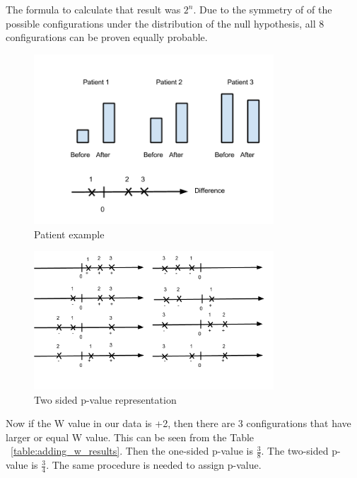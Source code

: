 \documentclass[12pt]{article}
\begin{document}
The formula to calculate that result was $2^n$. Due to the symmetry of of the possible configurations under the distribution of the null hypothesis, all 8 configurations can be proven equally probable.
\begin{figure}[h!]
  \centering
  \includegraphics[width=0.8\textwidth]{patientExample}
  \caption{Patient example}
  \label{fig:patientExample}
\end{figure}

\begin{figure}[h!]
  \centering
  \includegraphics[width=0.8\textwidth]{rankSignsExample}
  \caption{Two sided p-value representation}
  \label{fig:rankSignsExample}
\end{figure}

Now if the W value in our data is +2, then there are 3 configurations that have larger or equal W value. This can be seen from the Table ~\ref{table:adding_w_results}. Then the one-sided p-value is $\frac{3}{8}$. The two-sided p-value is $\frac{3}{4}$. The same procedure is needed to assign p-value.
\end{document}
